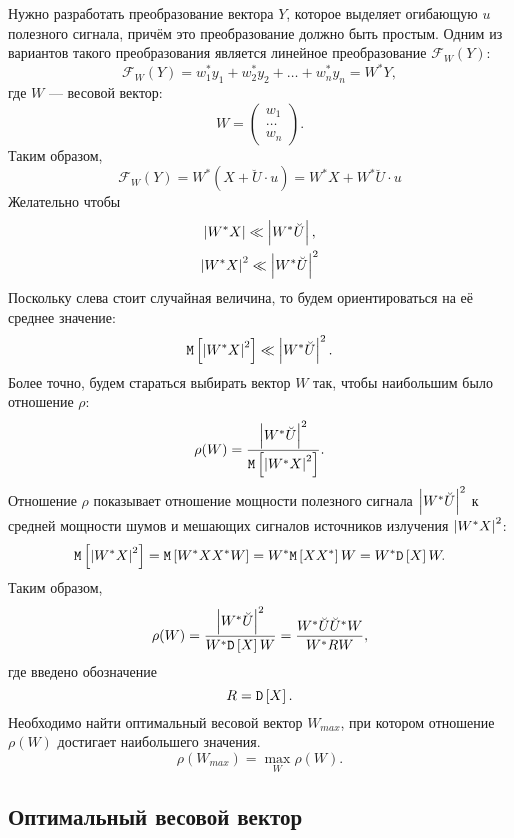 Нужно разработать преобразование вектора $Y$, которое выделяет огибающую $u$ полезного сигнала, причём это преобразование должно быть простым. Одним из вариантов такого
преобразования является линейное преобразование $\mathcal{F}_W(Y)$:
\[
    \mathcal{F}_W(Y)
    = w_1^* y_1 + w_2^* y_2 + \dots + w_n^* y_n
    = W^* Y,
\]
где $W$ --- весовой вектор:
\[
    W =
    \begin{pmatrix}
        w_1   \\
        \dots \\
        w_n
    \end{pmatrix}.
\]
Таким образом,
\[
    \mathcal{F}_W(Y)
    = W^* \left( X + \breve{U} \cdot u \right)
    = W^* X + W^* \breve{U} \cdot u
\]
Желательно чтобы
\begin{gather*}
    \left | W^* X \right | \ll \left | W^* \breve{U} \right | , \\
    \left | W^* X \right |^2 \ll \left | W^* \breve{U} \right |^2
\end{gather*}
Поскольку слева стоит случайная величина, то будем ориентироваться на её среднее значение:
\[
    \mathtt{M} \left [ \left | W^* X \right |^2 \right ] \ll \left | W^* \breve{U} \right |^2 .
\]
Более точно, будем стараться выбирать вектор $W$ так, чтобы наибольшим было отношение $\rho$:
\[
    \rho ( W ) = \frac{\left | W^* \breve{U} \right |^2}{\mathtt{M} \left [ \left | W^* X \right |^2 \right ]} .
\]
Отношение $\rho$ показывает отношение мощности полезного сигнала $\left | W^* \breve{U} \right |^2$ к средней мощности шумов и мешающих сигналов источников излучения $\left | W^* X \right |^2$:
\[
    \mathtt{M} \left [ \left | W^* X \right |^2 \right ]
    = \mathtt{M} \left [ W^* X X^* W \right ]
    = W^* \mathtt{M} \left [ X X^* \right ] W
    = W^* \mathtt{D} \left [ X \right ] W .
\]
Таким образом,
\[
    \rho ( W )
    = \frac{\left | W^* \breve{U} \right |^2}{W^* \mathtt{D} \left [ X \right ] W}
    = \frac{W^* \breve{U} \breve{U}^* W}{W^* R W} ,
\]
где введено обозначение
\[
    R = \mathtt{D} \left [ X \right ] .
\]
Необходимо найти оптимальный весовой вектор $W_{max}$, при котором отношение $\rho(W)$ достигает наибольшего значения.
\[
    \rho(W_{max}) = \max \limits_W \rho(W) .
\]

\subsection{Оптимальный весовой вектор}

